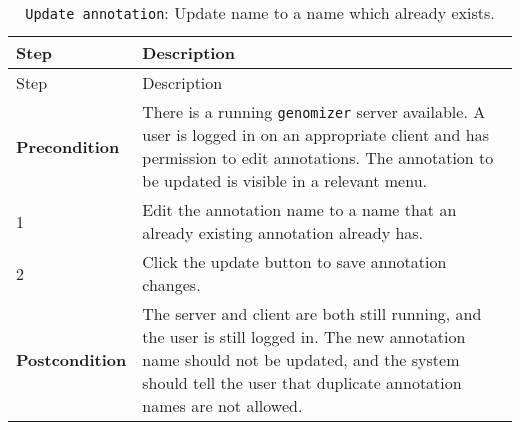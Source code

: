 \begin{longtable}[c]{@{}ll@{}}
\caption{\texttt{Update\ annotation}: Update name to a name which
already exists.}\tabularnewline
\toprule
\begin{minipage}[b]{0.31\columnwidth}\raggedright\strut
Step
\strut\end{minipage} &
\begin{minipage}[b]{0.63\columnwidth}\raggedright\strut
Description
\strut\end{minipage}\tabularnewline
\midrule
\endfirsthead
\toprule
\begin{minipage}[b]{0.31\columnwidth}\raggedright\strut
Step
\strut\end{minipage} &
\begin{minipage}[b]{0.63\columnwidth}\raggedright\strut
Description
\strut\end{minipage}\tabularnewline
\midrule
\endhead
\begin{minipage}[t]{0.31\columnwidth}\raggedright\strut
\textbf{Precondition}
\strut\end{minipage} &
\begin{minipage}[t]{0.63\columnwidth}\raggedright\strut
There is a running \texttt{genomizer} server available. A user is logged
in on an appropriate client and has permission to edit annotations. The
annotation to be updated is visible in a relevant menu.
\strut\end{minipage}\tabularnewline
\begin{minipage}[t]{0.31\columnwidth}\raggedright\strut
1
\strut\end{minipage} &
\begin{minipage}[t]{0.63\columnwidth}\raggedright\strut
Edit the annotation name to a name that an already existing annotation
already has.
\strut\end{minipage}\tabularnewline
\begin{minipage}[t]{0.31\columnwidth}\raggedright\strut
2
\strut\end{minipage} &
\begin{minipage}[t]{0.63\columnwidth}\raggedright\strut
Click the update button to save annotation changes.
\strut\end{minipage}\tabularnewline
\begin{minipage}[t]{0.31\columnwidth}\raggedright\strut
\textbf{Postcondition}
\strut\end{minipage} &
\begin{minipage}[t]{0.63\columnwidth}\raggedright\strut
The server and client are both still running, and the user is still
logged in. The new annotation name should not be updated, and the system
should tell the user that duplicate annotation names are not allowed.
\strut\end{minipage}\tabularnewline
\bottomrule
\end{longtable}

